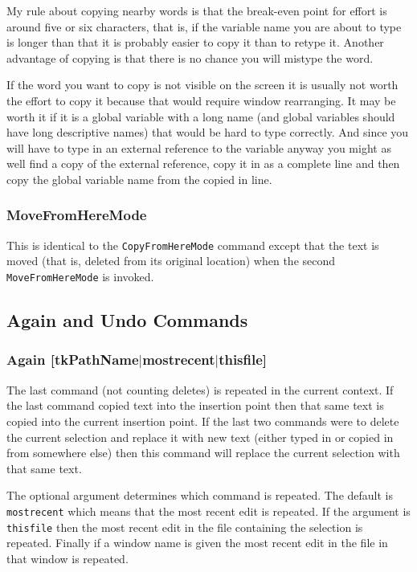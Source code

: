 My rule about copying nearby words is that the break-even point for
effort is around five or six characters, that is, if the variable name
you are about to type is longer than that it is probably easier to
copy it than to retype it.
Another advantage of copying is that there is no chance you will mistype
the word.

If the word you want to copy is not visible on the screen it is usually
not worth the effort to copy it because that would require window
rearranging.
It may be worth it if it is a global variable with a long name
(and global variables should have long descriptive names)
that would be hard to type correctly.
And since you will have to type in an external reference to the
variable anyway you might as well find a copy of the external reference,
copy it in as a complete line and then copy the global variable name
from the copied in line.

\subsubsection{MoveFromHereMode}
This is identical to the {\tt CopyFromHereMode} command except that the text
is moved (that is, deleted from its original location) when the
second {\tt MoveFromHereMode} is invoked.





\subsection{Again and Undo Commands}

\subsubsection{Again [tkPathName$\mid$mostrecent$\mid$thisfile]}
The last command (not counting deletes) is repeated in the current context.
If the last command copied text into the insertion point then that same
text is copied into the current insertion point.
If the last two commands were to delete the current selection and replace
it with new text (either typed in or copied in from somewhere else) then
this command will replace the current selection with that same text.

The optional argument determines which command is repeated.
The default is {\tt mostrecent} which means that the most
recent edit is repeated.
If the argument is {\tt thisfile} then the most recent edit
in the file containing the selection is repeated.
Finally if a window name is given the most recent edit in the
file in that window is repeated.

